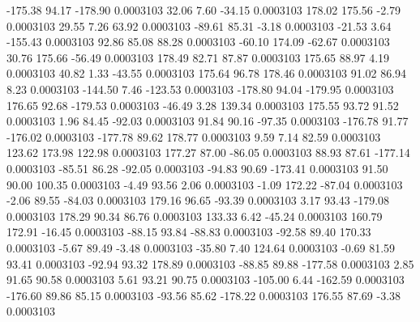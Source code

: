      -175.38       94.17     -178.90     0.0003103
       32.06        7.60      -34.15     0.0003103
      178.02      175.56       -2.79     0.0003103
       29.55        7.26       63.92     0.0003103
      -89.61       85.31       -3.18     0.0003103
      -21.53        3.64     -155.43     0.0003103
       92.86       85.08       88.28     0.0003103
      -60.10      174.09      -62.67     0.0003103
       30.76      175.66      -56.49     0.0003103
      178.49       82.71       87.87     0.0003103
      175.65       88.97        4.19     0.0003103
       40.82        1.33      -43.55     0.0003103
      175.64       96.78      178.46     0.0003103
       91.02       86.94        8.23     0.0003103
     -144.50        7.46     -123.53     0.0003103
     -178.80       94.04     -179.95     0.0003103
      176.65       92.68     -179.53     0.0003103
      -46.49        3.28      139.34     0.0003103
      175.55       93.72       91.52     0.0003103
        1.96       84.45      -92.03     0.0003103
       91.84       90.16      -97.35     0.0003103
     -176.78       91.77     -176.02     0.0003103
     -177.78       89.62      178.77     0.0003103
        9.59        7.14       82.59     0.0003103
      123.62      173.98      122.98     0.0003103
      177.27       87.00      -86.05     0.0003103
       88.93       87.61     -177.14     0.0003103
      -85.51       86.28      -92.05     0.0003103
      -94.83       90.69     -173.41     0.0003103
       91.50       90.00      100.35     0.0003103
       -4.49       93.56        2.06     0.0003103
       -1.09      172.22      -87.04     0.0003103
       -2.06       89.55      -84.03     0.0003103
      179.16       96.65      -93.39     0.0003103
        3.17       93.43     -179.08     0.0003103
      178.29       90.34       86.76     0.0003103
      133.33        6.42      -45.24     0.0003103
      160.79      172.91      -16.45     0.0003103
      -88.15       93.84      -88.83     0.0003103
      -92.58       89.40      170.33     0.0003103
       -5.67       89.49       -3.48     0.0003103
      -35.80        7.40      124.64     0.0003103
       -0.69       81.59       93.41     0.0003103
      -92.94       93.32      178.89     0.0003103
      -88.85       89.88     -177.58     0.0003103
        2.85       91.65       90.58     0.0003103
        5.61       93.21       90.75     0.0003103
     -105.00        6.44     -162.59     0.0003103
     -176.60       89.86       85.15     0.0003103
      -93.56       85.62     -178.22     0.0003103
      176.55       87.69       -3.38     0.0003103
